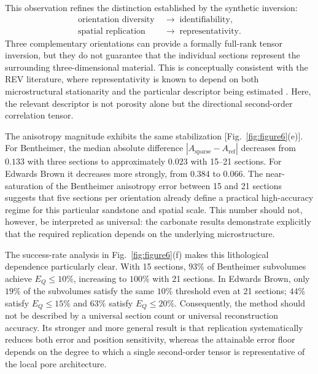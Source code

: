 \documentclass{article}
\begin{document}
This observation refines the distinction established by the synthetic inversion:
%
\begin{equation}
    \boxed{
    \begin{aligned}
    \text{orientation diversity} &\;\longrightarrow\; \text{identifiability},\\
    \text{spatial replication}   &\;\longrightarrow\; \text{representativity}.
    \end{aligned}
    }
    \label{eq:identifiability_representativity}
\end{equation}
%
Three complementary orientations can provide a formally full-rank tensor inversion, but they do not guarantee that the individual sections represent the surrounding three-dimensional material. This is conceptually consistent with the REV literature, where representativity is known to depend on both microstructural stationarity and the particular descriptor being estimated \cite{AlRaoush2010,Singh2020,Zubov2024}. Here, the relevant descriptor is not porosity alone but the directional second-order correlation tensor.

The anisotropy magnitude exhibits the same stabilization [Fig.~\ref{fig:figure6}(e)]. For Bentheimer, the median absolute difference $|A_{\mathrm{sparse}}-A_{\mathrm{ref}}|$ decreases from $0.133$ with three sections to approximately $0.023$ with 15--21 sections. For Edwards Brown it decreases more strongly, from $0.384$ to $0.066$. The near-saturation of the Bentheimer anisotropy error between 15 and 21 sections suggests that five sections per orientation already define a practical high-accuracy regime for this particular sandstone and spatial scale. This number should not, however, be interpreted as universal: the carbonate results demonstrate explicitly that the required replication depends on the underlying microstructure.

The success-rate analysis in Fig.~\ref{fig:figure6}(f) makes this lithological dependence particularly clear. With 15 sections, $93\%$ of Bentheimer subvolumes achieve $E_Q\leq10\%$, increasing to $100\%$ with 21 sections. In Edwards Brown, only $19\%$ of the subvolumes satisfy the same $10\%$ threshold even at 21 sections; $44\%$ satisfy $E_Q\leq15\%$ and $63\%$ satisfy $E_Q\leq20\%$. Consequently, the method should not be described by a universal section count or universal reconstruction accuracy. Its stronger and more general result is that replication systematically reduces both error and position sensitivity, whereas the attainable error floor depends on the degree to which a single second-order tensor is representative of the local pore architecture.
\end{document}

